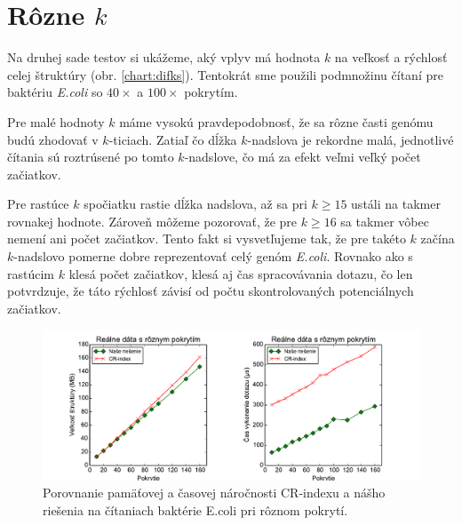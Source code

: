 \section{Rôzne $k$}

Na druhej sade testov si ukážeme, aký vplyv má hodnota $k$ na veľkosť a rýchlosť celej štruktúry (obr. \ref{chart:difks}).
Tentokrát sme použili podmnožinu čítaní pre baktériu \emph{E.coli} so $40\times$ a $100\times$ pokrytím.

Pre malé hodnoty $k$ máme vysokú pravdepodobnosť, že sa rôzne časti genómu budú zhodovať v $k$-ticiach.
Zatiaľ čo dĺžka $k$-nadslova je rekordne malá, jednotlivé
čítania sú roztrúsené po tomto $k$-nadslove, čo má za efekt veľmi veľký počet začiatkov.

Pre rastúce
$k$ spočiatku rastie dĺžka nadslova, až sa pri $k \ge 15$ ustáli na takmer rovnakej hodnote. Zároveň
môžeme pozorovať, že pre $k \ge 16$ sa takmer vôbec nemení ani počet začiatkov. Tento fakt si
vysvetľujeme tak, že pre takéto $k$ začína $k$-nadslovo pomerne dobre reprezentovať celý genóm
\emph{E.coli}. Rovnako ako s rastúcim $k$ klesá počet začiatkov, klesá aj čas spracovávania dotazu, čo len
potvrdzuje, že táto rýchlosť závisí od počtu skontrolovaných potenciálnych začiatkov.

\begin{figure}

\centerline{\includegraphics[width=1\textwidth]{images/chart_srcr.pdf}}

\caption[Porovnanie CR-indexu a našej štruktúry]{Porovnanie pamäťovej a časovej náročnosti
CR-indexu a nášho riešenia na čítaniach baktérie E.coli pri rôznom pokrytí.}

\label{chart:srcr}

\end{figure}

